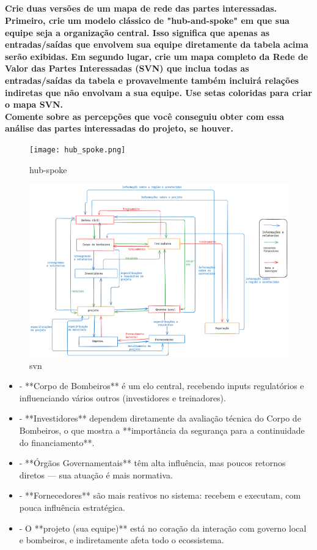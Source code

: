 \documentclass[a4paper,12pt]{report}
\begin{document}
\subsection*{}
\textbf{Crie duas versões de um mapa de rede das partes interessadas. Primeiro, crie um modelo clássico de "hub-and-spoke" em que sua equipe seja a organização central. Isso significa que apenas as entradas/saídas que envolvem sua equipe diretamente da tabela acima serão exibidas. Em segundo lugar, crie um mapa completo da Rede de Valor das Partes Interessadas (SVN) que inclua todas as entradas/saídas da tabela e provavelmente também incluirá relações indiretas que não envolvam a sua equipe. Use setas coloridas para criar o mapa SVN.\\
Comente sobre as percepções que você conseguiu obter com essa análise das partes interessadas do projeto, se houver.}
\begin{figure}[h!]
    \centering
    \texttt{[image: hub\_spoke.png]}
    \caption{hub-spoke}
    \label{hub-spoke}
\end{figure}
\begin{figure}[h!]
    \centering
    \includegraphics[width=0.75\linewidth]{svn.png}
    \caption{svn}
    \label{svn}
\end{figure}

\begin{itemize}
    \item - **Corpo de Bombeiros** é um elo central, recebendo inputs regulatórios e influenciando vários outros (investidores e treinadores).
    \item  - **Investidores** dependem diretamente da avaliação técnica do Corpo de Bombeiros, o que mostra a **importância da segurança para a continuidade do financiamento**.    

    \item  - **Órgãos Governamentais** têm alta influência, mas poucos retornos diretos — sua atuação é mais normativa.
   \item  - **Fornecedores** são mais reativos no sistema: recebem e executam, com pouca influência estratégica.
   \item - O **projeto (sua equipe)** está no coração da interação com governo local e bombeiros, e indiretamente afeta todo o ecossistema.
\end{itemize}



    

    

    
\end{document}

